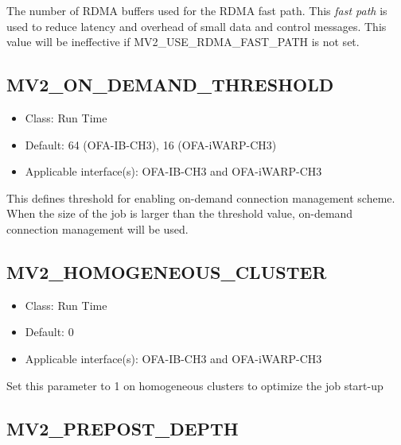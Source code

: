 The number of RDMA buffers used for the RDMA fast path. This \emph{fast
path} is used to reduce latency and overhead of small data and control
messages. This value will be ineffective if MV2\_USE\_RDMA\_FAST\_PATH is
not set. 

%
%
%

\subsection{MV2\_ON\_DEMAND\_THRESHOLD}
\label{def:mv2-on-demand-threshold}
\begin{itemize}
    \item Class: Run Time
    \item Default: 64 (OFA-IB-CH3), 16 (OFA-iWARP-CH3)
    \item Applicable interface(s): OFA-IB-CH3 and OFA-iWARP-CH3
\end{itemize}
This defines threshold for enabling on-demand connection management
scheme. When the size of the job is larger than the threshold value,
on-demand connection management will be used.

\subsection{MV2\_HOMOGENEOUS\_CLUSTER}
\label{def:mv2-homogeneous-cluster}
\begin{itemize}
    \item Class: Run Time
    \item Default: 0
    \item Applicable interface(s): OFA-IB-CH3 and OFA-iWARP-CH3
\end{itemize}
Set this parameter to 1 on homogeneous clusters to optimize the job start-up

\subsection{MV2\_PREPOST\_DEPTH}
\label{def:rdma-prepost-depth}

